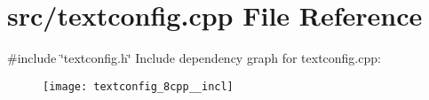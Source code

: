 \section{src/textconfig.cpp File Reference}
\label{textconfig_8cpp}
{\ttfamily \#include \char`\"{}textconfig.\+h\char`\"{}}\newline
Include dependency graph for textconfig.\+cpp\+:\nopagebreak
\begin{figure}[H]
\begin{center}
\leavevmode
\texttt{[image: textconfig\_8cpp\_\_incl]}
\end{center}
\end{figure}
